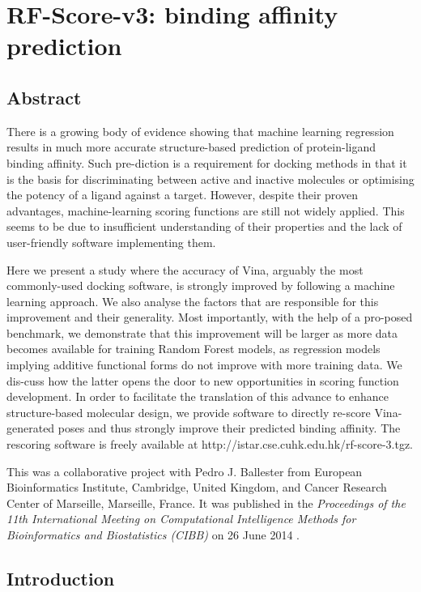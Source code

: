 \chapter{RF-Score-v3: binding affinity prediction}

\section{Abstract}

There is a growing body of evidence showing that machine learning regression results in much more accurate structure-based prediction of protein-ligand binding affinity. Such pre-diction is a requirement for docking methods in that it is the basis for discriminating between active and inactive molecules or optimising the potency of a ligand against a target. However, despite their proven advantages, machine-learning scoring functions are still not widely applied. This seems to be due to insufficient understanding of their properties and the lack of user-friendly software implementing them.

Here we present a study where the accuracy of Vina, arguably the most commonly-used docking software, is strongly improved by following a machine learning approach. We also analyse the factors that are responsible for this improvement and their generality. Most importantly, with the help of a pro-posed benchmark, we demonstrate that this improvement will be larger as more data becomes available for training Random Forest models, as regression models implying additive functional forms do not improve with more training data. We dis-cuss how the latter opens the door to new opportunities in scoring function development. In order to facilitate the translation of this advance to enhance structure-based molecular design, we provide software to directly re-score Vina-generated poses and thus strongly improve their predicted binding affinity. The rescoring software is freely available at http://istar.cse.cuhk.edu.hk/rf-score-3.tgz.

This was a collaborative project with Pedro J. Ballester from European Bioinformatics Institute, Cambridge, United Kingdom, and Cancer Research Center of Marseille, Marseille, France. It was published in the \textit{Proceedings of the 11th International Meeting on Computational Intelligence Methods for Bioinformatics and Biostatistics (CIBB)} on 26 June 2014 \citep{1433}.

\section{Introduction}


